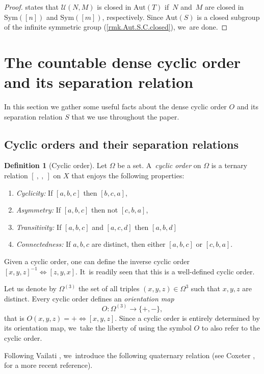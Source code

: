 \documentclass[10pt,a4paper]{amsart}
\newcommand{\Subsection}{\subsection}
\theoremstyle{definition}
\newtheorem{definition}[definition]{Definition}
\newcommand{\Aut}{\mathrm{Aut}}
\newcommand{\Sym}{\mathrm{Sym}}
\newcommand{\U}{\mathcal{U}}
\begin{document}
\begin{proof}
\cite[Th.\,6(v)]{biregular} states that $\U(N,M)$ is closed in $\Aut(T)$ if~$N$ and~$M$ are closed in $\Sym([n])$ and $\Sym([m])$, respectively.
Since $\Aut(S)$ is a closed subgroup of the infinite symmetric group (\cref{rmk.Aut.S.C.closed}), we~are done.
\end{proof}

\appendix
\section{The countable dense cyclic order and its separation relation}
\label{sec.order.and.separation}

In this section we gather some useful facts about the dense cyclic order $O$ and its separation relation $S$ that we use throughout the paper.

\Subsection{Cyclic orders and their separation relations}

\begin{definition}[Cyclic order]
\label{def.cyclic.order}
Let $\Omega$ be a set. A~\emph{cyclic order} on $\Omega$ is a ternary relation $[\ ,\ ,\ ]$ on $X$ that enjoys the following properties:
\begin{enumerate}
\item \emph{Cyclicity:} If $[a, b, c]$ then $[b, c, a]$,
\item\emph{Asymmetry:} If $[a, b, c]$ then not $[c, b, a]$,
\item\emph{Transitivity:} If $[a, b, c]$ and $[a, c, d]$ then $[a, b, d]$
\item\emph{Connectedness:} If $a, b,c$ are distinct, then either $[a, b, c]$ or $[c, b, a]$.
\end{enumerate}
\end{definition}

Given a cyclic order, one can define the inverse cyclic order $[x,y,z]^{-1}\iff[z,y,x]$. It~is readily seen that this is a well-defined cyclic order.

Let us denote by $\Omega^{(3)}$ the set of all triples $(x,y,z) \in \Omega^3$ such that $x,y,z$ are distinct.
Every cyclic order defines an \emph{orientation map}
\[
 O \colon \Omega^{(3)} \to \{+,-\}, 
\]
that is $O(x,y,z)=+ \iff [x,y,z]$.
Since a cyclic order is entirely determined by its orientation map, we~take the liberty of using the symbol $O$ to also refer to the cyclic order.

Following Vailati \cite[\S204, p.\,215]{Russel}, we~introduce the following quaternary relation (see Coxeter \cite[Ch.\,3]{Coxeter}, for a more recent reference).
\end{document}
